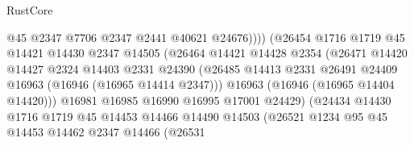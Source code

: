 \begin{lexlean}{RustCore}
\begin{coremodule}
                                        @45
                                        @2347
                                        @7706
                                        @2347
                                        @2441
                                        @40621
                                        @24676))))
                                (@26454
                                  @1716
                                  @1719
                                  @45
                                  @14421
                                  @14430
                                  @2347
                                  @14505
                                  (@26464
                                    @14421
                                    @14428
                                    @2354
                                    (@26471
                                      @14420
                                      @14427
                                      @2324
                                      @14403
                                      @2331
                                      @24390
                                      (@26485
                                        @14413
                                        @2331
                                        @26491
                                        @24409
                                        @16963
                                        (@16946 (@16965 @14414 @2347)))
                                      @16963
                                      (@16946 (@16965 @14404 @14420)))
                                    @16981
                                    @16985
                                    @16990
                                    @16995
                                    @17001
                                    @24429)
                                  (@24434
                                    @14430
                                    @1716
                                    @1719
                                    @45
                                    @14453
                                    @14466
                                    @14490
                                    @14503
                                    (@26521
                                      @1234
                                      @95
                                      @45
                                      @14453
                                      @14462
                                      @2347
                                      @14466
                                      (@26531

\end{coremodule}
\end{lexlean}
